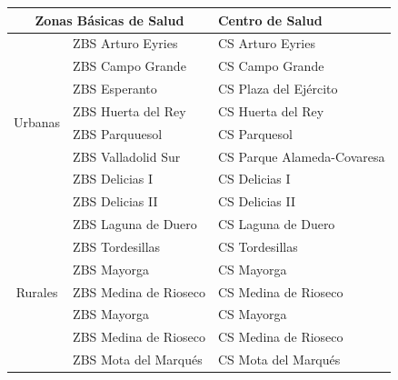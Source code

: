 \begin{table}[H]
    \centering
    \begin{tabular}{cll}
        \toprule
        \multicolumn{2}{c}{Zonas   Básicas de Salud} & Centro de Salud                                      \\
        \midrule
        \multirow{8}{*}{Urbanas}                     & ZBS Arturo Eyries       & CS Arturo Eyries           \\
                                                     & ZBS Campo Grande        & CS Campo Grande            \\
                                                     & ZBS Esperanto           & CS Plaza del Ejército      \\
                                                     & ZBS Huerta del Rey      & CS Huerta del Rey          \\
                                                     & ZBS Parquuesol          & CS Parquesol               \\
                                                     & ZBS Valladolid Sur      & CS Parque Alameda-Covaresa \\
                                                     & ZBS Delicias I          & CS Delicias I              \\
                                                     & ZBS Delicias II         & CS Delicias II             \\
        \midrule
        \multirow{11}{*}{Rurales}                    & ZBS Laguna de Duero     & CS Laguna de Duero         \\
                                                     & ZBS Tordesillas         & CS Tordesillas             \\
                                                     & ZBS Mayorga             & CS Mayorga                 \\
                                                     & ZBS Medina de Rioseco   & CS Medina de Rioseco       \\
                                                     & ZBS Mayorga             & CS Mayorga                 \\
                                                     & ZBS Medina de Rioseco   & CS Medina de Rioseco       \\
                                                     & ZBS Mota del Marqués    & CS Mota del Marqués        \\

\end{tabular}
\end{table}
